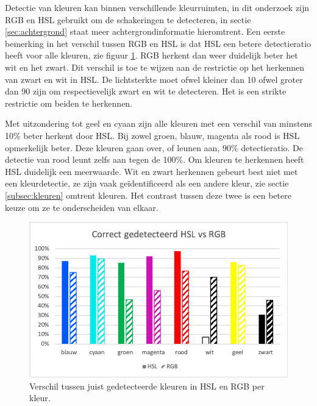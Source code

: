 Detectie van kleuren kan binnen verschillende kleurruimten, in dit onderzoek zijn RGB en HSL gebruikt om de schakeringen te detecteren, in sectie \ref{sec:achtergrond} staat meer achtergrondinformatie hieromtrent. Een eerste bemerking in het verschil tussen RGB en HSL is dat HSL een betere detectieratio heeft voor alle kleuren, zie figuur \ref{fig:HSLvsRGB}. RGB herkent dan weer duidelijk beter het wit en het zwart. Dit verschil is toe te wijzen aan de restrictie op het herkennen van zwart en wit in HSL. De lichtsterkte moet ofwel kleiner dan 10 ofwel groter dan 90 zijn om respectievelijk zwart en wit te detecteren. Het is een strikte restrictie om beiden te herkennen.

Met uitzondering tot geel en cyaan zijn alle kleuren met een verschil van minstens 10\% beter herkent door HSL. Bij zowel groen, blauw, magenta als rood is HSL opmerkelijk beter. Deze kleuren gaan over, of leunen aan, 90\% detectieratio. De detectie van rood leunt zelfs aan tegen de 100\%.
Om kleuren te herkennen heeft HSL duidelijk een meerwaarde. Wit en zwart herkennen gebeurt best niet met een kleurdetectie, ze zijn vaak geïdentificeerd als een andere kleur, zie sectie \ref{subsec:kleuren} omtrent kleuren. Het contrast tussen deze twee is een betere keuze om ze te onderscheiden van elkaar.

\begin{figure}
	\center
	\includegraphics{img/HSLvsRGB}
	\caption{Verschil tussen juist gedetecteerde kleuren in HSL en RGB per kleur.}
	\label{fig:HSLvsRGB}
\end{figure}

				